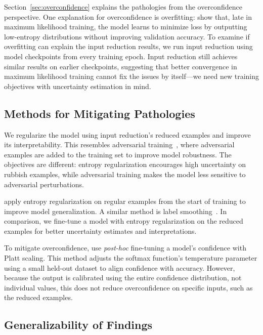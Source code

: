 Section~\ref{sec:overconfidence} explains the pathologies from the
overconfidence perspective. One explanation for overconfidence is overfitting:
\citet{guo2017calibration} show that, late in maximum likelihood training,
the model learns to minimize loss by outputting low-entropy distributions without
improving validation accuracy. To examine if overfitting can explain the input
reduction results, we run input reduction using  model checkpoints from
every training epoch. Input reduction still achieves similar results on earlier
checkpoints, suggesting that better convergence in maximum likelihood
training cannot fix the issues by itself---we need new training objectives with
uncertainty estimation in mind.

\subsection{Methods for Mitigating Pathologies}

We regularize the model using input reduction's reduced examples
and improve its interpretability. This resembles adversarial
training~\cite{goodfellow2014explaining}, where adversarial examples are added to
the training set to improve model robustness. The objectives are different:
entropy regularization
encourages high uncertainty on rubbish examples, while adversarial training
makes the model less sensitive to adversarial perturbations.

\citet{pereyra2017regularizing} apply entropy regularization on regular examples
from the start of training to improve model generalization. A similar
method is label smoothing~\cite{szegedy2016rethinking}.  In comparison, we
fine-tune a model with entropy regularization on the reduced examples
for better uncertainty estimates and interpretations.

To mitigate overconfidence, \citet{guo2017calibration} use
\emph{post-hoc} fine-tuning a model's confidence with Platt scaling.
This method adjusts the softmax function's temperature parameter using a
small held-out dataset to align confidence with accuracy.
However, because the output is calibrated using the entire
confidence distribution, not individual values, this does not reduce
overconfidence on specific inputs, such as the reduced examples.

\subsection{Generalizability of Findings}

